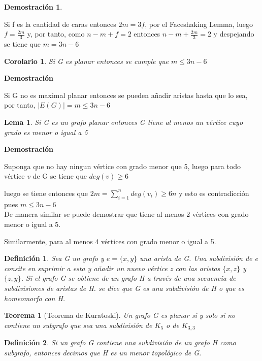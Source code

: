 \documentclass[a4paper,1pt]{report}
\newtheorem*{teo}{Teorema}
\newtheorem*{cor}{Corolario}
\newtheorem*{dem}{Demostración}
\newtheorem*{dfn}{Definición}
\newtheorem*{lem}{Lema}
\begin{document}
\begin{dem}
 
\end{dem}

Si f es la cantidad de caras entonces $2m=3f$, por el Faceshaking Lemma, luego  
$f = \frac{2m}{3}$ y, por tanto, como $n-m+f=2$ entonces $n-m + \frac{2m}{3} = 2$ y despejando se tiene que $m=3n-6$


\begin{cor}
 Si G es planar entonces se cumple que $m\leq3n-6$
\end{cor}

\textbf{Demostración}

Si G no es maximal planar entonces se pueden añadir aristas hasta que lo sea, por tanto, 
$|E(G)|=m\leq3n-6$

\begin{lem}
 Si G es un grafo planar entonces G tiene al menos un vértice cuyo grado es menor o igual a 5
\end{lem}

\textbf{Demostración}

Suponga que no hay ningun vértice con grado menor que 5, luego para todo vértice $v$ de G se tiene que $deg(v)\geq 6$

luego se tiene entonces que $2m=\sum^n_{i=1} deg(v_i)\geq 6n$ y esto es contradicción pues $m\leq3n-6$\\

De manera similar se puede demostrar que tiene al menos 2 vértices con grado menor o igual a 5.

Similarmente, para al menos 4  vértices con grado menor o igual a 5.


\begin{dfn}
 Sea G un grafo y $e=\{x,y\}$ una arista de G. Una subdivisión de e consite en suprimir a esta y añadir un nuevo vértice z con las aristas $\{x,z\}$  y $\{z,y\}$. Si el grafo G se obtiene de un grafo H a través de una secuencia de subdivisiones de aristas de H. se dice que G es una subdivisión de H o que es homeomorfo con H.
\end{dfn}   

\begin{teo}[Teorema de Kuratoski]
 Un grafo G es planar si y solo si no contiene un subgrafo que sea una subdivisión de $K_5$ o de $K_{3,3}$
\end{teo}

\begin{dfn} 
Si un grafo G contiene una subdivisión de un grafo H como subgrafo, entonces decimos que H es un menor topológico de G. 
\end{dfn}
\end{document}
